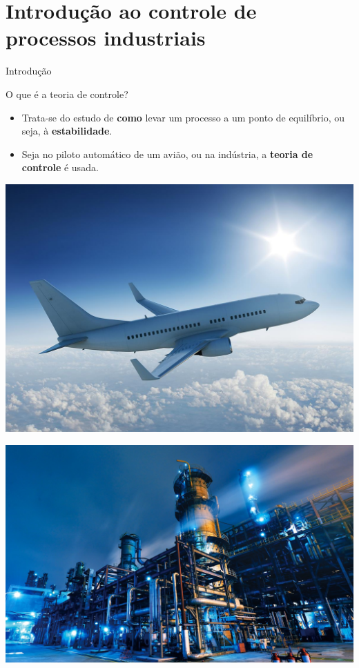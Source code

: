 \section{Introdução ao controle de processos industriais}

\begin{frame}{Introdução}
	\begin{block}{O que é a teoria de controle?}
		\begin{itemize}
			\item Trata-se do estudo de \textbf{como} levar um processo a um ponto de equilíbrio, ou seja, à \textbf{estabilidade}.
			\item Seja no piloto automático de um avião, ou na indústria, a \textbf{teoria de controle} é usada.
		\end{itemize}
	\end{block}

	\begin{minipage}{0.49\linewidth}
		\centering
		\includegraphics[width=1\linewidth]{Figuras/Ch11/fig1}
	\end{minipage}
	\hfill
	\begin{minipage}{0.49\linewidth}
		\centering
		\includegraphics[width=1\linewidth]{Figuras/Ch11/fig2}
	\end{minipage}
\end{frame}


